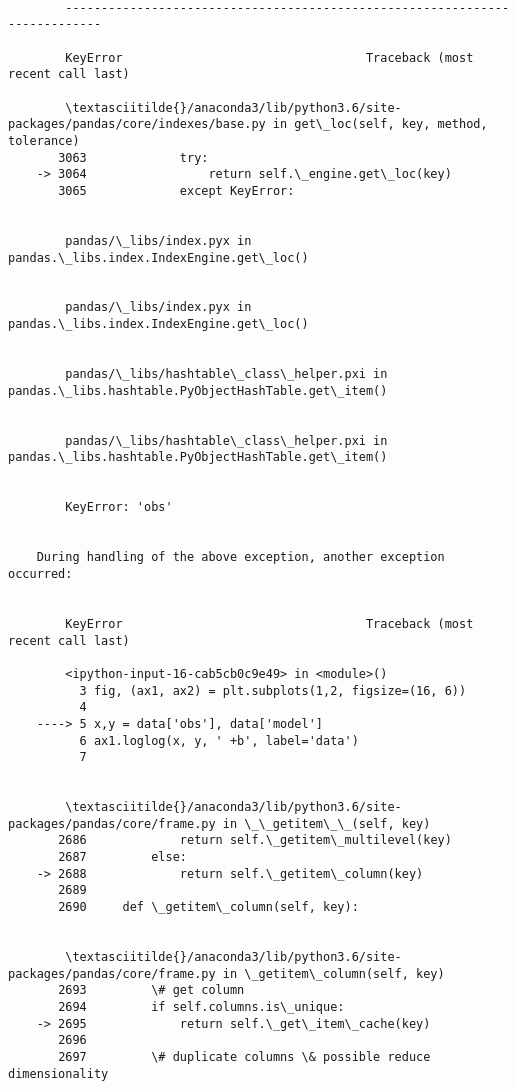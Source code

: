 \documentclass[11pt]{article}
\begin{document}
    \begin{Verbatim}[commandchars=\\\{\}]

        ---------------------------------------------------------------------------

        KeyError                                  Traceback (most recent call last)

        \textasciitilde{}/anaconda3/lib/python3.6/site-packages/pandas/core/indexes/base.py in get\_loc(self, key, method, tolerance)
       3063             try:
    -> 3064                 return self.\_engine.get\_loc(key)
       3065             except KeyError:


        pandas/\_libs/index.pyx in pandas.\_libs.index.IndexEngine.get\_loc()


        pandas/\_libs/index.pyx in pandas.\_libs.index.IndexEngine.get\_loc()


        pandas/\_libs/hashtable\_class\_helper.pxi in pandas.\_libs.hashtable.PyObjectHashTable.get\_item()


        pandas/\_libs/hashtable\_class\_helper.pxi in pandas.\_libs.hashtable.PyObjectHashTable.get\_item()


        KeyError: 'obs'

        
    During handling of the above exception, another exception occurred:


        KeyError                                  Traceback (most recent call last)

        <ipython-input-16-cab5cb0c9e49> in <module>()
          3 fig, (ax1, ax2) = plt.subplots(1,2, figsize=(16, 6))
          4 
    ----> 5 x,y = data['obs'], data['model']
          6 ax1.loglog(x, y, ' +b', label='data')
          7 


        \textasciitilde{}/anaconda3/lib/python3.6/site-packages/pandas/core/frame.py in \_\_getitem\_\_(self, key)
       2686             return self.\_getitem\_multilevel(key)
       2687         else:
    -> 2688             return self.\_getitem\_column(key)
       2689 
       2690     def \_getitem\_column(self, key):


        \textasciitilde{}/anaconda3/lib/python3.6/site-packages/pandas/core/frame.py in \_getitem\_column(self, key)
       2693         \# get column
       2694         if self.columns.is\_unique:
    -> 2695             return self.\_get\_item\_cache(key)
       2696 
       2697         \# duplicate columns \& possible reduce dimensionality



\end{Verbatim}
\end{document}
